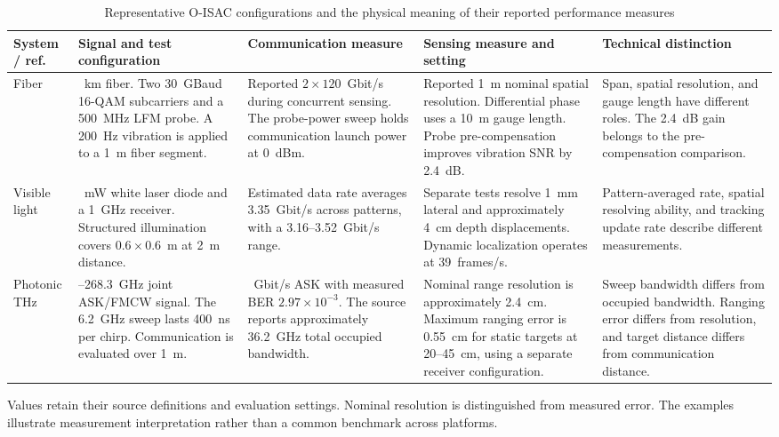 \begin{table}[!t]
\caption{Representative O-ISAC configurations and the physical meaning of
their reported performance measures}
\label{tab:section2_quantitative_examples}
\centering
\begingroup
\footnotesize
\setlength{\tabcolsep}{4pt}
\renewcommand{\arraystretch}{1.15}
\begin{tabularx}{\textwidth}{@{}
>{\raggedright\arraybackslash}p{}
>{\raggedright\arraybackslash}p{}
>{\raggedright\arraybackslash}p{}
>{\raggedright\arraybackslash}p{}
>{\raggedright\arraybackslash}X@{}}
\toprule
\textbf{System / ref.} &
\textbf{Signal and test configuration} &
\textbf{Communication measure} &
\textbf{Sensing measure and setting} &
\textbf{Technical distinction} \\
\midrule
Fiber\newline\cite{OISAC_SCR00057} &
40~km fiber. Two 30~GBaud 16-QAM subcarriers and a 500~MHz LFM probe.
A 200~Hz vibration is applied to a 1~m fiber segment. &
Reported $2\times120$~Gbit/s during concurrent sensing.
The probe-power sweep holds communication launch power at 0~dBm. &
Reported 1~m nominal spatial resolution.
Differential phase uses a 10~m gauge length.
Probe pre-compensation improves vibration SNR by 2.4~dB. &
Span, spatial resolution, and gauge length have different roles.
The 2.4~dB gain belongs to the pre-compensation comparison. \\
\addlinespace[4pt]
Visible light\newline\cite{OISAC_SCR00196} &
225~mW white laser diode and a 1~GHz receiver.
Structured illumination covers $0.6\times0.6$~m at 2~m distance. &
Estimated data rate averages 3.35~Gbit/s across patterns,
with a 3.16--3.52~Gbit/s range. &
Separate tests resolve 1~mm lateral and approximately 4~cm depth
displacements. Dynamic localization operates at 39~frames/s. &
Pattern-averaged rate, spatial resolving ability, and tracking update rate
describe different measurements. \\
\addlinespace[4pt]
Photonic THz\newline\cite{OISAC_SCR00083} &
262.1--268.3~GHz joint ASK/FMCW signal.
The 6.2~GHz sweep lasts 400~ns per chirp.
Communication is evaluated over 1~m. &
15~Gbit/s ASK with measured BER $2.97\times10^{-3}$.
The source reports approximately 36.2~GHz total occupied bandwidth. &
Nominal range resolution is approximately 2.4~cm.
Maximum ranging error is 0.55~cm for static targets at 20--45~cm,
using a separate receiver configuration. &
Sweep bandwidth differs from occupied bandwidth.
Ranging error differs from resolution, and target distance differs
from communication distance. \\
\bottomrule
\end{tabularx}
\par\vspace{3pt}
\noindent\parbox{\textwidth}{\raggedright\footnotesize
Values retain their source definitions and evaluation settings. Nominal
resolution is distinguished from measured error. The examples illustrate
measurement interpretation rather than a common benchmark across platforms.\par}
\endgroup
\end{table}

